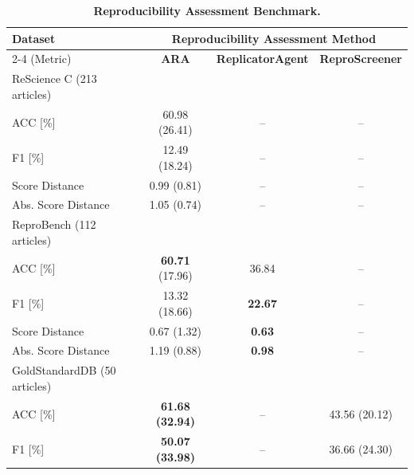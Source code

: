 \documentclass{article}
\begin{document}
\begin{table}[!ht]
    \centering
    \caption{\textbf{Reproducibility Assessment Benchmark.}}
    \label{tab:benchmark-comparison}
    \begin{tabular}{lccc}
        \toprule
        \textbf{Dataset} & \multicolumn{3}{c}{\textbf{Reproducibility Assessment Method}} \\
        \cmidrule(lr){2-4}
        \;\;\;\;(Metric) & \textbf{ARA} & \textbf{ReplicatorAgent} & \textbf{ReproScreener} \\
        \midrule
        {ReScience C} (213 articles) & & & \\
        \;\;\;\;ACC [\%] & 60.98 (26.41) & -- & -- \\
        \;\;\;\;F1 [\%] & 12.49 (18.24) & -- & -- \\
        \;\;\;\;Score Distance & 0.99 (0.81) & -- & -- \\
        \;\;\;\;Abs. Score Distance & 1.05 (0.74) & -- & -- \\
        {ReproBench} (112 articles) & & & \\
        \;\;\;\;ACC [\%] & \textbf{60.71} (17.96) & 36.84 & -- \\
        \;\;\;\;F1 [\%] & 13.32 (18.66) & \textbf{22.67} & -- \\
        \;\;\;\;Score Distance & 0.67 (1.32) & \textbf{0.63} & -- \\
        \;\;\;\;Abs. Score Distance & 1.19 (0.88) & \textbf{0.98} & -- \\
        {GoldStandardDB} (50 articles) & & &  \\
        \;\;\;\;ACC [\%] & \textbf{61.68 (32.94)} & -- & 43.56 (20.12) \\
        \;\;\;\;F1 [\%] & \textbf{50.07 (33.98)} & -- & 36.66 (24.30) \\
        \bottomrule
    \end{tabular}
\end{table}
\end{document}
